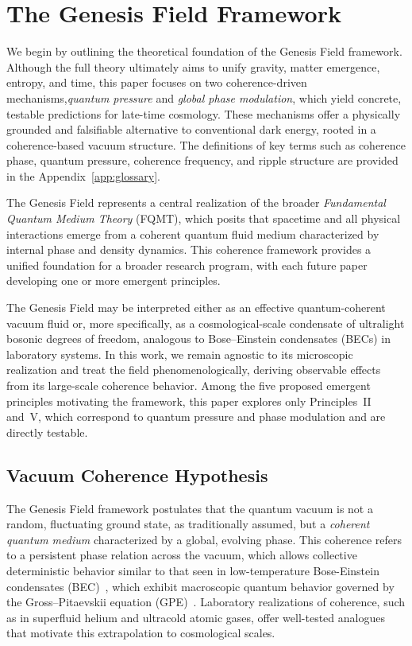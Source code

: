 \section{The Genesis Field Framework}
\label{sec:field_framework}

We begin by outlining the theoretical foundation of the Genesis Field framework. Although the full theory ultimately aims to unify gravity, matter emergence, entropy, and time, this paper focuses on two coherence-driven mechanisms,\emph{quantum pressure} and \emph{global phase modulation}, which yield concrete, testable predictions for late-time cosmology. These mechanisms offer a physically grounded and falsifiable alternative to conventional dark energy, rooted in a coherence-based vacuum structure. The definitions of key terms such as coherence phase, quantum pressure, coherence frequency, and ripple structure are provided in the Appendix~\ref{app:glossary}.

The Genesis Field represents a central realization of the broader \emph{Fundamental Quantum Medium Theory} (FQMT), which posits that spacetime and all physical interactions emerge from a coherent quantum fluid medium characterized by internal phase and density dynamics. This coherence framework provides a unified foundation for a broader research program, with each future paper developing one or more emergent principles.

The Genesis Field may be interpreted either as an effective quantum-coherent vacuum fluid or, more specifically, as a cosmological-scale condensate of ultralight bosonic degrees of freedom, analogous to Bose–Einstein condensates (BECs) in laboratory systems. In this work, we remain agnostic to its microscopic realization and treat the field phenomenologically, deriving observable effects from its large-scale coherence behavior. Among the five proposed emergent principles motivating the framework, this paper explores only Principles~II and~V, which correspond to quantum pressure and phase modulation and are directly testable.

\subsection{Vacuum Coherence Hypothesis}
\label{sec:principle1}

The Genesis Field framework postulates that the quantum vacuum is not a random, fluctuating ground state, as traditionally assumed, but a \emph{coherent quantum medium} characterized by a global, evolving phase. This coherence refers to a persistent phase relation across the vacuum, which allows collective deterministic behavior similar to that seen in low-temperature Bose-Einstein condensates (BEC)~\cite{Bose1924,Einstein1925}, which exhibit macroscopic quantum behavior governed by the Gross–Pitaevskii equation (GPE)~\cite{Gross1961,Pitaevskii1961}. Laboratory realizations of coherence, such as in superfluid helium and ultracold atomic gases, offer well-tested analogues that motivate this extrapolation to cosmological scales.

